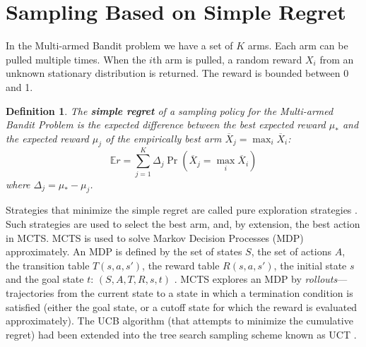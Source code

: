 \documentclass[letterpaper]{article}
\newcommand {\IE} {\ensuremath {\mathbb{E}}}
\newtheorem{dfn}{Definition}
\begin{document}
\section{Sampling Based on Simple Regret}
\label{sec:results}

In the Multi-armed Bandit problem \cite{Vermorel.bandits} we have a set
of $K$ arms. Each arm can be pulled multiple times. When the $i$th arm
is pulled, a random reward $X_i$ from an unknown stationary
distribution is returned.  The reward is bounded between 0 and 1.

\begin{dfn}
The \textbf{simple regret} of a sampling policy for the Multi-armed Bandit
Problem is the expected difference between the best expected reward
$\mu_*$ and the expected reward $\mu_j$ of the empirically best arm
$\overline X_j=\max_i\overline X_i$:
\begin{equation}
\IE r=\sum_{j=1}^K\Delta_j\Pr(\overline X_j=\max_i\overline X_i)
\label{eqn:simple-regret}
\end{equation}
where $\Delta_j=\mu_*-\mu_j$.
\end{dfn}

Strategies that minimize the simple regret are called pure exploration
strategies \cite{Bubeck.pure}. Such strategies are used to select the
best arm, and, by extension, the best action in MCTS. MCTS is used to
solve Markov Decision Processes (MDP) approximately. An MDP is defined
by the set of states $S$, the set of actions $A$, the transition table
$T(s, a, s')$, the reward table $R(s, a, s')$, the initial state $s$
and the goal state $t$: $(S, A, T, R, s, t)$ \cite{Russell.aima}.
MCTS explores an MDP by \emph{rollouts}---trajectories from the
current state to a state in which a termination condition is satisfied
(either the goal state, or a cutoff state for which the reward is
evaluated approximately). The UCB algorithm (that attempts to minimize
the cumulative regret) \cite{Auer.ucb} had been extended into the tree
search sampling scheme known as UCT \cite{Kocsis.uct}.
\end{document}
